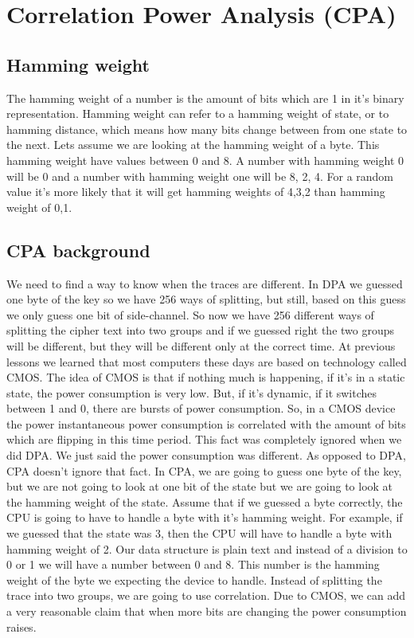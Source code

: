 \section{Correlation Power Analysis (CPA)}\label{c8_cpa:sec}
\subsection{Hamming weight}\label{c8_CPA_hamming_weight:subsec}
The hamming weight of a number is the amount of bits which are 1 in it's binary representation. 
Hamming weight can refer to a hamming weight of state, or to hamming distance, which means how many bits change between from one state to the next. Lets assume we are looking at the hamming weight of a byte. This hamming weight have values between 0 and 8. A number with hamming weight 0 will be 0 and a number with hamming weight one will be 8, 2, 4. For a random value it's more likely that it will get hamming weights of 4,3,2 than hamming weight of 0,1.

\subsection{CPA background}\label{c8_CPA_background:subsec}
We need to find a way to know when the traces are different. In DPA we guessed one byte of the key so we have 256 ways of splitting, but still, based on this guess we only guess one bit of side-channel. So now we have 256 different ways of splitting the cipher text into two groups and if we guessed right the two groups will be different, but they will be different only at the correct time. At previous lessons we learned that most computers these days are based on technology called CMOS. The idea of CMOS is that if nothing much is happening, if it’s in a static state,  the power consumption is very low. But, if it’s dynamic, if it switches between 1 and 0, there are bursts of power consumption. So, in a CMOS device the power instantaneous power consumption is correlated with the amount of bits which are flipping in this time period. This fact was completely ignored when we did DPA. We just said the power consumption was different. As opposed to DPA, CPA doesn't ignore that fact. 
In CPA, we are going to guess one byte of the key, but we are not going to look at one bit of the state but we are going to look at the hamming weight of the state. 
Assume that if we guessed a byte correctly, the CPU is going to have to handle a byte with it's hamming weight. For example, if we  guessed that the state was 3, then the CPU will have to handle a byte with hamming weight of 2. Our data structure is plain text and instead of a division to 0 or 1 we will have a number between 0 and 8. This number is the hamming weight of the byte we expecting the device to handle. Instead of splitting the trace into two groups, we are going to use correlation. Due to CMOS, we can add a very reasonable claim that when more bits are changing the power consumption raises.
